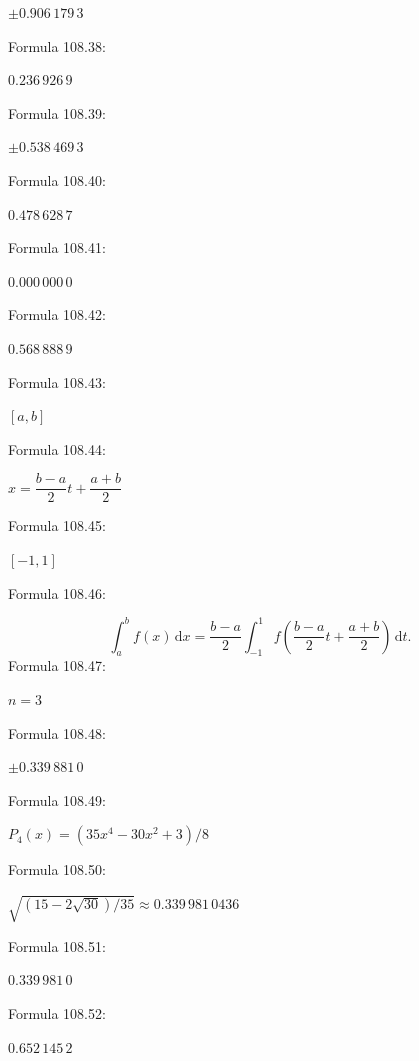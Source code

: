 \documentclass[11pt]{article}
\begin{document}
$\pm0.906\,179\,3$\par
\noindent Formula 108.38:\par
$0.236\,926\,9$\par
\noindent Formula 108.39:\par
$\pm0.538\,469\,3$\par
\noindent Formula 108.40:\par
$0.478\,628\,7$\par
\noindent Formula 108.41:\par
$0.000\,000\,0$\par
\noindent Formula 108.42:\par
$0.568\,888\,9$\par
\noindent Formula 108.43:\par
$[a,b]$\par
\noindent Formula 108.44:\par
$x=\dfrac{b-a}{2}t+\dfrac{a+b}{2}$\par
\noindent Formula 108.45:\par
$[-1,1]$\par
\noindent Formula 108.46:\par
\[
\int_a^b f(x)\,\mathrm{d}x
=\frac{b-a}{2}\int_{-1}^{1}f\left(\frac{b-a}{2}t+\frac{a+b}{2}\right)\,\mathrm{d}t.
\]
\noindent Formula 108.47:\par
$n=3$\par
\noindent Formula 108.48:\par
$\pm0.339\,881\,0$\par
\noindent Formula 108.49:\par
$P_4(x)=(35x^4-30x^2+3)/8$\par
\noindent Formula 108.50:\par
$\sqrt{(15-2\sqrt{30})/35}\approx0.339\,981\,0436$\par
\noindent Formula 108.51:\par
$0.339\,981\,0$\par
\noindent Formula 108.52:\par
$0.652\,145\,2$\par
\clearpage
\end{document}

